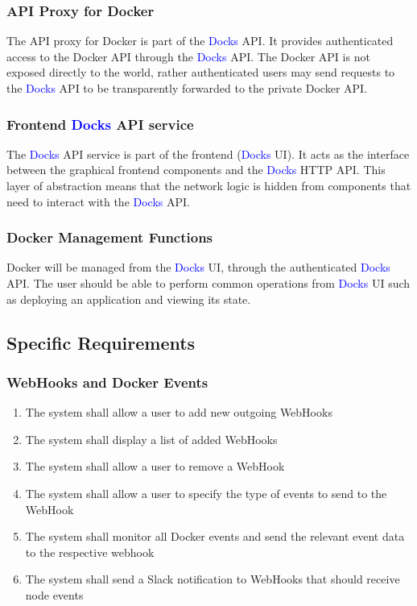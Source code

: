 \documentclass[]{article}
\newcommand{\docks}{\textcolor{Blue}{Docks} }
\newcommand{\docker}{Docker }
\begin{document}
\subsubsection{API Proxy for \docker}
The API proxy for \docker is part of the \docks API. It provides authenticated
access to the \docker API through the \docks API. The \docker API is not
exposed directly to the world, rather authenticated users may send
requests to the \docks API to be transparently forwarded to the
private \docker API.

\subsubsection{Frontend \docks API service}
The \docks API service is part of the frontend (\docks UI). It acts as the interface
between the graphical frontend components and the \docks HTTP API.
This layer of abstraction means that the network logic is hidden from
components that need to interact with the \docks API.

\subsubsection{\docker Management Functions}
\docker will be managed from the \docks UI, through the authenticated
\docks API. The user should be able to perform common operations
from \docks UI such as deploying an application and viewing its state.

\subsection{Specific Requirements}

\subsubsection{WebHooks and Docker Events}
\begin{enumerate}[label=R1.\arabic*.]
	\item The system shall allow a user to add new outgoing WebHooks
	\item The system shall display a list of added WebHooks
	\item The system shall allow a user to remove a WebHook
	\item The system shall allow a user to specify the type of events to send to the WebHook
	\item The system shall monitor all \docker events and send the relevant event data to the respective webhook
	\item The system shall send a Slack notification to WebHooks that should receive node events
\end{enumerate}
\end{document}
